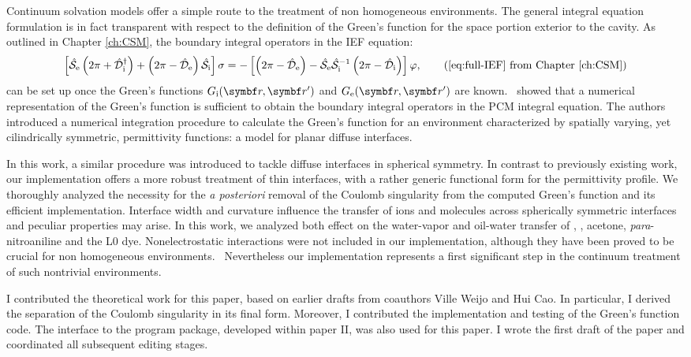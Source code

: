 Continuum solvation models offer a simple route to the treatment of non
homogeneous environments.
The general integral equation formulation is in fact transparent with respect
to the definition of the Green's function for the space portion exterior to the
cavity.
As outlined in Chapter \ref{ch:CSM}, the boundary integral operators in the
\acrshort{IEF} equation:
\begin{equation}
  \left[ \bi{S}_\mathrm{e}\left(2\pi + \bi{D}^\dagger_\mathrm{i}\right)
  +
  \left(2\pi - \bi{D}_\mathrm{e}\right)\bi{S}_\mathrm{i}
  \right]\sigma =
  -\left[\left(2\pi-\bi{D}_\mathrm{e}\right)
  -\bi{S}_\mathrm{e}\bi{S}_\mathrm{i}^{-1}
  \left(2\pi-\bi{D}_\mathrm{i}\right)
  \right]\esp,
  \tag{\ref{eq:full-IEF} from Chapter \ref{ch:CSM}}
\end{equation}
can be set up once the Green's functions $\Gi$ and $\Ge$ are known.~\autocite{Cances1998-og}
\citeauthor{Frediani2004-er} showed that a numerical representation of the
Green's function is sufficient to obtain the boundary integral operators in the
\acrshort{PCM} integral equation.
The authors introduced a numerical integration procedure to calculate the
Green's function for an environment characterized by spatially varying, yet
cilindrically symmetric, permittivity functions: a model for planar diffuse interfaces.

In this work, a similar procedure was introduced to tackle diffuse interfaces
in spherical symmetry.
In contrast to previously existing work, our implementation offers a more robust
treatment of thin interfaces, with a rather generic functional form for the
permittivity profile.
We thoroughly analyzed the necessity for the \emph{a posteriori} removal of the
Coulomb singularity from the computed Green's function and its efficient
implementation.
Interface width and curvature influence the transfer of ions and molecules across
spherically symmetric interfaces and peculiar properties may arise.
In this work, we analyzed both effect on the water-vapor and oil-water transfer
of , , acetone, \emph{para}-nitroaniline and the L0 dye.
Nonelectrostatic interactions were not included in our implementation, although
they have been proved to be crucial for non homogeneous
environments.~\autocite{Mozgawa2014-ad}
Nevertheless our implementation represents a first significant step in the continuum treatment
of such nontrivial environments.

I contributed the theoretical work for this paper, based on earlier drafts from coauthors
Ville Weijo and Hui Cao. In particular, I derived the separation of
the Coulomb singularity in its final form.
Moreover, I contributed the implementation and testing of the Green's function code.
The interface to the \LSDALTON program package, developed within paper II, was
also used for this paper.
I wrote the first draft of the paper and coordinated all subsequent editing stages.

